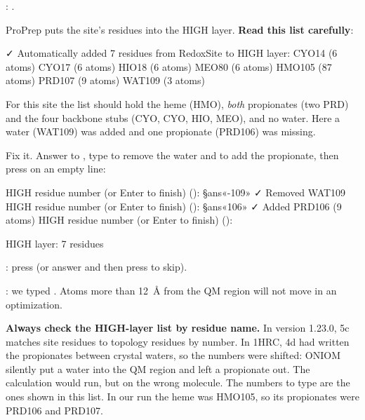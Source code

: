 \begin{steps}
  \item {}: .
  \item ProPrep puts the site's residues into the HIGH layer.
        \textbf{Read this list carefully}:
\begin{screen}
✓ Automatically added 7 residues from RedoxSite to HIGH layer:
    CYO14 (6 atoms)
    CYO17 (6 atoms)
    HIO18 (6 atoms)
    MEO80 (6 atoms)
    HMO105 (87 atoms)
    PRD107 (9 atoms)
    WAT109 (3 atoms)
\end{screen}
        For this site the list should hold the heme (HMO), \emph{both}
        propionates (two PRD) and the four backbone stubs (CYO, CYO, HIO,
        MEO), and no water. Here a water (WAT109) was added and one
        propionate (PRD106) was missing.
  \item Fix it. Answer  to ,
        type  to remove the water and  to add the
        propionate, then press  on an empty line:
\begin{screen}
  HIGH residue number (or Enter to finish) (): §ans«-109»
✓ Removed WAT109
  HIGH residue number (or Enter to finish) (): §ans«106»
✓ Added PRD106 (9 atoms)
  HIGH residue number (or Enter to finish) ():

HIGH layer: 7 residues
\end{screen}
  \item {}: press
         (or answer  and then press  to skip).
  \item {}: we typed . Atoms more than 12~\AA{} from the QM
        region will not move in an optimization.
\end{steps}

\begin{watchout}
\textbf{Always check the HIGH-layer list by residue name.} In version 1.23.0,
5c matches site residues to topology residues by number. In 1HRC, 4d had
written the propionates between crystal waters, so the numbers were shifted:
ONIOM silently put a water into the QM region and left a propionate out. The
calculation would run, but on the wrong molecule. The numbers to type are the
ones shown in this list. In our run the heme was HMO105, so its propionates
were PRD106 and PRD107.
\end{watchout}


